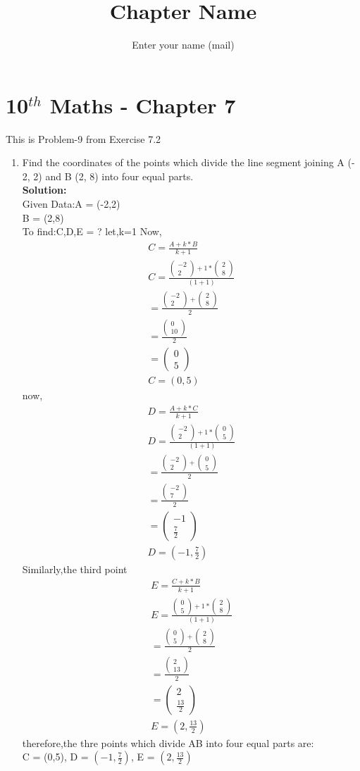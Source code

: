 \documentclass[12pt]{article}
\title{Chapter Name}
\author{Enter your name (mail)}
\newcommand{\myvec}[1]{\ensuremath{\begin{pmatrix}#1\end{pmatrix}}}
\newcommand{\solution}{\noindent \textbf{Solution: }}
\begin{document}
\maketitle
\section*{10$^{th}$ Maths - Chapter 7}
This is Problem-9 from Exercise 7.2
\begin{enumerate}
\item Find the coordinates of the points which divide the line segment joining A (- 2, 2) and B (2, 8) into four equal parts.  \\
\solution \\
Given Data:A = (-2,2)\\
           B = (2,8)\\
To find:C,D,E = ?
let,k=1
Now, 
\begin{align}
C = \frac{A+k*B}{k+1}\\
C = \frac{\myvec{-2\\2}+1*\myvec{2\\8}}{(1+1)}\\
= \frac{\myvec{-2\\2}+\myvec{2\\8}}{2}\\
= \frac{\myvec{0\\10}}{2}\\
 = \myvec{0\\5}\\
C = (0,5)
\end{align}	
now, 
\begin{align}
D = \frac{A+k*C}{k+1}\\
D = \frac{\myvec{-2\\2}+1*\myvec{0\\5}}{(1+1)}\\
= \frac{\myvec{-2\\2}+\myvec{0\\5}}{2}\\
= \frac{\myvec{-2\\7}}{2}\\
= \myvec{-1\\\frac{7}{2}}\\
D = (-1,\frac{7}{2})
\end{align}
Similarly,the third point 
\begin{align}
E = \frac{C+k*B}{k+1}\\
E = \frac{\myvec{0\\5}+1*\myvec{2\\8}}{(1+1)}\\
= \frac{\myvec{0\\5}+\myvec{2\\8}}{2}\\
= \frac{\myvec{2\\13}}{2}\\
 = \myvec{2\\\frac{13}{2}}\\
E = (2,\frac{13}{2})
\end{align}
therefore,the thre points which divide AB into four equal parts are:\\
C = (0,5),
D = $(-1,\frac{7}{2})$,
E = $(2,\frac{13}{2})$
\end{enumerate}
\end{document}
